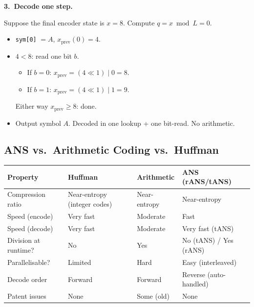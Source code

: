 \begin{examplebox}
\medskip
\textbf{3.\ Decode one step.}

Suppose the final encoder state is $x = 8$.
Compute $q = x \bmod L = 0$.

\begin{itemize}
  \item \texttt{sym[0]} $= A$, $x_{\text{prev}}(0) = 4$.
  \item $4 < 8$: read one bit $b$.
        \begin{itemize}
          \item If $b=0$: $x_{\text{prev}} = (4 \ll 1)\mid 0 = 8$.
          \item If $b=1$: $x_{\text{prev}} = (4 \ll 1)\mid 1 = 9$.
        \end{itemize}
        Either way $x_{\text{prev}} \ge 8$: done.
  \item Output symbol $A$.  Decoded in one lookup + one
        bit-read.  No arithmetic.
\end{itemize}
\end{examplebox}

\subsection{ANS vs.\ Arithmetic Coding vs.\ Huffman}

\begin{center}
\begin{tabular}{@{}p{3.5cm}p{3.5cm}p{3.5cm}p{3.5cm}@{}}
\toprule
\textbf{Property} & \textbf{Huffman}
  & \textbf{Arithmetic} & \textbf{ANS (rANS/tANS)} \\
\midrule
Compression ratio & Near-entropy (integer codes)
  & Near-entropy & Near-entropy \\
Speed (encode)    & Very fast  & Moderate & Fast \\
Speed (decode)    & Very fast  & Moderate & Very fast (tANS) \\
Division at runtime? & No & Yes & No (tANS) / Yes (rANS) \\
Parallelisable?   & Limited    & Hard     & Easy (interleaved) \\
Decode order      & Forward    & Forward  & Reverse (auto-handled) \\
Patent issues     & None       & Some (old) & None \\
\bottomrule
\end{tabular}
\end{center}

